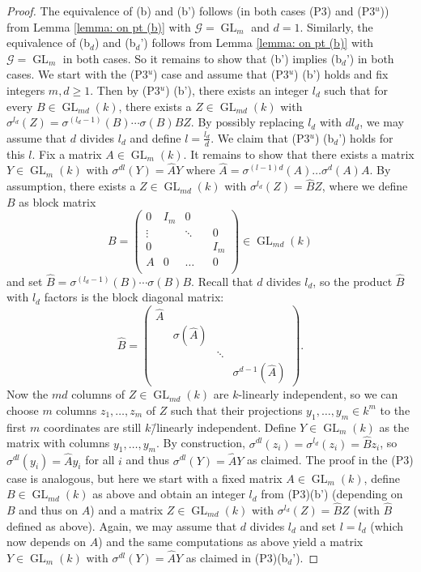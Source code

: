 \documentclass[oneside,reqno]{amsart}
\theoremstyle{definition}
\newcommand{\G}{\mathcal{G}}
\newcommand{\Gl}{\operatorname{GL}}
\newcommand{\s}{\sigma}
\newcommand{\pt}{{\rm{(P3$^u$)}}}
\newcommand{\ptweak}{{\rm{(P3)}}}
\begin{document}
\begin{proof} 
	The equivalence of (b) and  (b') follows (in both cases \ptweak{} and \pt{}) from Lemma \ref{lemma: on pt (b)} with $\G=\Gl_m$ and $d=1$. Similarly, the equivalence of (b$_d$) and  (b$_d$') follows from Lemma \ref{lemma: on pt (b)} with $\G=\Gl_m$ in both cases. So it remains to show that (b') implies  (b$_d$') in both cases. We start with the \pt{} case and assume that \pt{} (b') holds and fix integers $m,d\geq 1$. Then by \pt{} (b'), there exists an integer $l_d$ such that for every $B\in \Gl_{md}(k)$, there exists a $Z\in \Gl_{md}(k)$ with $\s^{l_d}(Z)=\s^{(l_d-1)}(B)\cdots \s(B) B Z$. By possibly replacing $l_d$ with $dl_d$, we may assume that $d$ divides $l_d$ and define $l=\frac{l_d}{d}$. We claim that \pt{} (b$_d$') holds for this $l$. Fix a matrix $A \in \Gl_m(k)$. It remains to show that there exists a matrix $Y\in \Gl_m(k)$ with $\s^{dl}(Y)=\hat AY$ where $\hat A=\s^{(l-1)d}(A)\ldots\s^d(A)A$. By assumption, there exists a $Z\in \Gl_{md}(k)$ with $\s^{l_d}(Z)=\hat B Z$, where we define $B$ as block matrix 
	$$ B=\begin{pmatrix} 
		0 & I_m & 0 &  & \\
		\vdots & & \ddots  &  & 0 \\
		0 & &  & & I_m  \\
		 A & 0& \dots  & & 0 \\
	\end{pmatrix} \in \Gl_{md}(k)$$
	and set $\hat B=\s^{(l_d-1)}(B)\cdots \s(B) B$. Recall that $d$ divides $l_d$, so the product $\hat B$ with $l_d$ factors is the block diagonal matrix:
	$$\hat B= \begin{pmatrix}
		\hat A & & & \\
		& \s(\hat A) & & \\
		& & \ddots & \\
		& & & \s^{d-1}(\hat A)
	\end{pmatrix}.$$
	Now the $md$ columns of $Z\in \Gl_{md}(k)$ are $k$-linearly independent, so we can choose $m$ columns $z_1,\dots,z_m$ of $Z$ such that their projections $y_1,\dots,y_m \in k^m$ to the first $m$ coordinates are still $k$\=/linearly independent. Define $Y\in \Gl_m(k)$ as the matrix with columns $y_1,\dots,y_m$. By construction, $\s^{dl}(z_i)=\s^{l_d}(z_i)=\hat B z_i$, so $\s^{dl}(y_i)=\hat A y_i$ for all $i$ and thus $\s^{dl}(Y)=\hat A Y$ as claimed. The proof in the \ptweak{} case is analogous, but here we start with a fixed matrix $A\in \Gl_m(k)$, define $B\in \Gl_{md}(k)$ as above and obtain an integer $l_d$ from \ptweak{}(b') (depending on $B$ and thus on $A$) and a matrix $Z\in \Gl_{md}(k)$ with $\s^{l_d}(Z)=\hat B Z$ (with $\hat B$ defined as above). Again, we may assume that $d$ divides $l_d$ and set $l=l_d$ (which now depends on $A$)  and the same computations as  above yield a matrix $Y\in \Gl_m(k)$ with $\s^{dl}(Y)=\hat A Y$ as claimed in \ptweak{}(b$_d$').
\end{proof}
\end{document}

